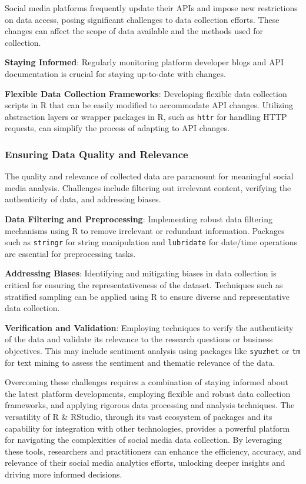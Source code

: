 \documentclass[
]{book}
\begin{document}
Social media platforms frequently update their APIs and impose new restrictions on data access, posing significant challenges to data collection efforts. These changes can affect the scope of data available and the methods used for collection.

\textbf{Staying Informed}: Regularly monitoring platform developer blogs and API documentation is crucial for staying up-to-date with changes.

\textbf{Flexible Data Collection Frameworks}: Developing flexible data collection scripts in R that can be easily modified to accommodate API changes. Utilizing abstraction layers or wrapper packages in R, such as \texttt{httr} for handling HTTP requests, can simplify the process of adapting to API changes.

\hypertarget{ensuring-data-quality-and-relevance}{%
\subsubsection*{Ensuring Data Quality and Relevance}\label{ensuring-data-quality-and-relevance}}

The quality and relevance of collected data are paramount for meaningful social media analysis. Challenges include filtering out irrelevant content, verifying the authenticity of data, and addressing biases.

\textbf{Data Filtering and Preprocessing}: Implementing robust data filtering mechanisms using R to remove irrelevant or redundant information. Packages such as \texttt{stringr} for string manipulation and \texttt{lubridate} for date/time operations are essential for preprocessing tasks.

\textbf{Addressing Biases}: Identifying and mitigating biases in data collection is critical for ensuring the representativeness of the dataset. Techniques such as stratified sampling can be applied using R to ensure diverse and representative data collection.

\textbf{Verification and Validation}: Employing techniques to verify the authenticity of the data and validate its relevance to the research questions or business objectives. This may include sentiment analysis using packages like \texttt{syuzhet} or \texttt{tm} for text mining to assess the sentiment and thematic relevance of the data.

Overcoming these challenges requires a combination of staying informed about the latest platform developments, employing flexible and robust data collection frameworks, and applying rigorous data processing and analysis techniques. The versatility of R \& RStudio, through its vast ecosystem of packages and its capability for integration with other technologies, provides a powerful platform for navigating the complexities of social media data collection. By leveraging these tools, researchers and practitioners can enhance the efficiency, accuracy, and relevance of their social media analytics efforts, unlocking deeper insights and driving more informed decisions.
\end{document}
